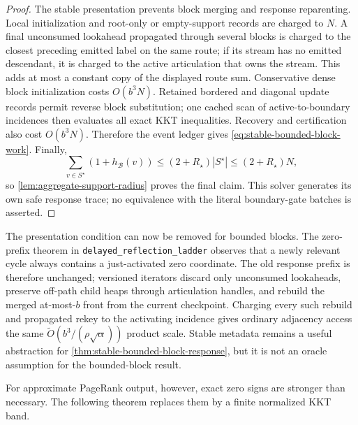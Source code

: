 \begin{proof}
The stable presentation prevents block merging and response reparenting.
Local initialization and root-only or empty-support records are charged to
$N$.  A final unconsumed lookahead propagated through several blocks is
charged to the closest preceding emitted label on the same route; if its
stream has no emitted descendant, it is charged to the active articulation
that owns the stream.  This adds at most a constant copy of the displayed
route sum.  Conservative dense block initialization costs $O(b^3N)$.
Retained bordered and diagonal update records permit reverse block
substitution; one cached scan of active-to-boundary incidences then evaluates
all exact KKT inequalities.  Recovery and certification also cost
$O(b^3N)$.  Therefore the event ledger gives
\cref{eq:stable-bounded-block-work}.  Finally,
\begin{equation*}
 \sum_{v\in S^\star}(1+h_{\mathcal B}(v))
 \leq (2+R_\star)|S^\star|\leq(2+R_\star)N,
\end{equation*}
so \cref{lem:aggregate-support-radius} proves the final claim.  This solver
generates its own safe response trace; no equivalence with the literal
boundary-gate batches is asserted.
\end{proof}

The presentation condition can now be removed for bounded blocks.  The
zero-prefix theorem in \texttt{delayed\_reflection\_ladder} observes that a
newly relevant cycle always contains a just-activated zero coordinate.  The
old response prefix is therefore unchanged; versioned iterators discard only
unconsumed lookaheads, preserve off-path child heaps through articulation
handles, and rebuild the merged at-most-$b$ front from the current checkpoint.
Charging every such rebuild and propagated rekey to the activating incidence
gives ordinary adjacency access the same
$\widetilde O(b^3/(\rho\sqrt\alpha))$ product scale.  Stable metadata remains
a useful abstraction for \cref{thm:stable-bounded-block-response}, but it is
not an oracle assumption for the bounded-block result.

For approximate PageRank output, however, exact zero signs are stronger than
necessary.  The following theorem replaces them by a finite normalized KKT
band.

